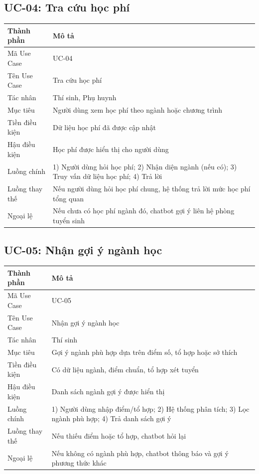 \documentclass[12pt,a4paper]{report}
\begin{document}
\subsection{UC-04: Tra cứu học phí}
\begin{table}[H]
\centering
\begin{tabular}{|p{3.5cm}|p{8.5cm}|}
\hline
\textbf{Thành phần} & \textbf{Mô tả} \\ \hline
Mã Use Case & UC-04 \\ \hline
Tên Use Case & Tra cứu học phí \\ \hline
Tác nhân & Thí sinh, Phụ huynh \\ \hline
Mục tiêu & Người dùng xem học phí theo ngành hoặc chương trình \\ \hline
Tiền điều kiện & Dữ liệu học phí đã được cập nhật \\ \hline
Hậu điều kiện & Học phí được hiển thị cho người dùng \\ \hline
Luồng chính & 1) Người dùng hỏi học phí; 2) Nhận diện ngành (nếu có); 3) Truy vấn dữ liệu học phí; 4) Trả lời \\ \hline
Luồng thay thế & Nếu người dùng hỏi học phí chung, hệ thống trả lời mức học phí tổng quan \\ \hline
Ngoại lệ & Nếu chưa có học phí ngành đó, chatbot gợi ý liên hệ phòng tuyển sinh \\ \hline
\end{tabular}
\end{table}

\subsection{UC-05: Nhận gợi ý ngành học}
\begin{table}[H]
\centering
\begin{tabular}{|p{3.5cm}|p{8.5cm}|}
\hline
\textbf{Thành phần} & \textbf{Mô tả} \\ \hline
Mã Use Case & UC-05 \\ \hline
Tên Use Case & Nhận gợi ý ngành học \\ \hline
Tác nhân & Thí sinh \\ \hline
Mục tiêu & Gợi ý ngành phù hợp dựa trên điểm số, tổ hợp hoặc sở thích \\ \hline
Tiền điều kiện & Có dữ liệu ngành, điểm chuẩn, tổ hợp xét tuyển \\ \hline
Hậu điều kiện & Danh sách ngành gợi ý được hiển thị \\ \hline
Luồng chính & 1) Người dùng nhập điểm/tổ hợp; 2) Hệ thống phân tích; 3) Lọc ngành phù hợp; 4) Trả danh sách gợi ý \\ \hline
Luồng thay thế & Nếu thiếu điểm hoặc tổ hợp, chatbot hỏi lại \\ \hline
Ngoại lệ & Nếu không có ngành phù hợp, chatbot thông báo và gợi ý phương thức khác \\ \hline
\end{tabular}
\end{table}
\end{document}
